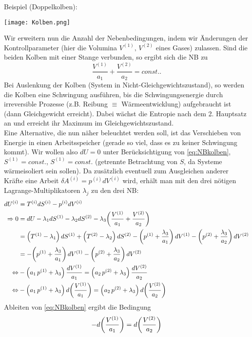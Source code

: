 \documentclass[../KlassMech_main.tex]{subfiles}
\begin{document}
Beispiel (Doppelkolben):\\
\begin{center}
\texttt{[image: Kolben.png]}
\end{center}
Wir erweitern nun die Anzahl der Nebenbedingungen, indem wir Änderungen der Kontrollparameter (hier die Volumina $V^{(1)}, \, V^{(2)}$ eines Gases) zulassen. Sind die beiden Kolben mit einer Stange verbunden, so ergibt sich die NB zu
\begin{equation}\label{eq:NBkolben}
\frac{V^{(1)}}{a_1} + \frac{V^{(2)}}{a_2} = const. .
\end{equation}
Bei Auslenkung der Kolben (System in Nicht-Gleichgewichtszustand), so werden die Kolben eine Schwingung ausführen, bis die Schwingungsenergie durch irreversible Prozesse (z.B. Reibung $\equiv$ Wärmeentwicklung) aufgebraucht ist (dann Gleichgewicht erreicht). Dabei wächst die Entropie nach dem 2. Hauptsatz an und erreicht ihr Maximum im Gleichgewichtszustand.\\
Eine Alternative, die nun näher beleuchtet werden soll, ist das Verschieben von Energie in einen Arbeitsspeicher (gerade so viel, dass es zu keiner Schwingung kommt). Wir wollen also $dU = 0$ unter Berücksichtigung von \eqref{eq:NBkolben}, $S^{(1)} = const.$, $S^{(1)} = const.$ (getrennte Betrachtung von $S$, da Systeme wärmeisoliert sein sollen). Da zusätzlich eventuell zum Ausgleichen anderer Kräfte eine Arbeit $\delta A^{(i)} = p^{(i)} dV^{(i)}$ wird, erhält man mit den drei nötigen Lagrange-Multiplikatoren $\lambda_j$ zu den drei NB:
\begin{align}
dU^{(i)} &= T^{(i)} dS^{(i)} - p^{(i)} dV^{(i)} 
\notag\\
\Rightarrow 0 &= dU - \lambda_1 dS^{(1)} - \lambda_2 dS^{(2)} - \lambda_3 \qty(\frac{V^{(1)}}{a_1} + \frac{V^{(2)}}{a_2}) 
\notag\\
&= \qty( T^{(1)} -\lambda_1)\, dS^{(1)} + \qty(T^{(2)} - \lambda_2)\, dS^{(2)} - \qty(p^{(1)} + \frac{\lambda_3}{a_1})\, dV^{(1)} - \qty(p^{(2)} + \frac{\lambda_3}{a_2})\, dV^{(2)}
\notag\\
&= - \qty(p^{(1)} + \frac{\lambda_3}{a_1})\, dV^{(1)} - \qty(p^{(2)} + \frac{\lambda_3}{a_2})\, dV^{(2)}
\notag\\
\Leftrightarrow & - \qty(a_1 \, p^{(1)} + \lambda_3)\, \frac{dV^{(1)}}{a_1} = \qty(a_2 \, p^{(2)} + \lambda_3)\, \frac{dV^{(2)}}{a_2}
\notag\\
\Leftrightarrow & - \qty(a_1 \, p^{(1)} + \lambda_3)\, d\qty(\frac{V^{(1)}}{a_1}) = \qty(a_2 \, p^{(2)} + \lambda_3)\, d\qty(\frac{V^{(2)}}{a_2})\label{eq:dglkolben}
\end{align}
Ableiten von \eqref{eq:NBkolben} ergibt die Bedingung
$$ -d\qty(\frac{V^{(1)}}{a_1}) = d\qty(\frac{V^{(2)}}{a_2})$$
\end{document}
